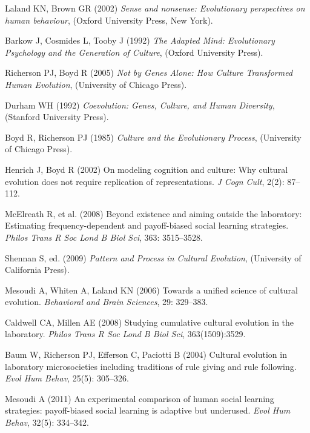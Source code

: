 \documentclass{article}
\begin{document}
\begin{thebibliography}{10}

Laland KN, Brown GR (2002) \emph{Sense and nonsense: Evolutionary perspectives on human behaviour}, (Oxford University Press, New York).

Barkow J, Cosmides L, Tooby J (1992) \emph{The Adapted Mind: Evolutionary Psychology and the Generation of Culture}, (Oxford University Press).

Richerson PJ, Boyd R (2005) \emph{Not by Genes Alone: How Culture Transformed Human Evolution},
(University of Chicago Press).

Durham WH (1992) \emph{Coevolution: Genes, Culture, and Human Diversity}, (Stanford University Press).

Boyd R, Richerson PJ (1985) \emph{Culture and the Evolutionary Process}, (University of Chicago Press).

Henrich J, Boyd R (2002) On modeling cognition and culture: Why cultural evolution does not
  require replication of representations. \emph{J Cogn Cult}, 2(2):
  87--112.

McElreath R, et al. (2008) Beyond existence and aiming outside the laboratory: Estimating
  frequency-dependent and payoff-biased social learning strategies. \emph{Philos Trans R Soc Lond B Biol Sci}, 363: 3515--3528.
  
Shennan S, ed. (2009) \emph{Pattern and Process in Cultural Evolution}, (University of California Press).

Mesoudi A, Whiten A, Laland KN (2006) Towards a unified science of cultural evolution. \emph{Behavioral and Brain Sciences}, 29: 329--383.

Caldwell CA, Millen AE (2008) Studying cumulative cultural evolution in the laboratory. \emph{Philos Trans R Soc Lond B Biol Sci}, 363(1509):3529.
  
Baum W, Richerson PJ, Efferson C, Paciotti B (2004) Cultural evolution in laboratory microsocieties including traditions of rule giving and rule following. \emph{Evol Hum Behav}, 25(5):
  305--326.

Mesoudi A (2011) An experimental comparison of human social learning strategies:
  payoff-biased social learning is adaptive but underused. \emph{Evol Hum Behav}, 32(5):
  334--342.


\end{thebibliography}
\end{document}
